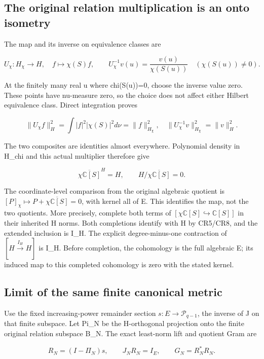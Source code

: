 \subsection{The original relation multiplication is an onto isometry}\label{the-original-relation-multiplication-is-an-onto-isometry}

The map and its inverse on equivalence classes are

\[
U_\chi:H_\chi\longrightarrow H,\quad f\longmapsto\chi(S)f,
\qquad
U_\chi^{-1}v(u)=\frac{v(u)}{\chi(S(u))}\quad(\chi(S(u))\ne0).
\tag{CR6}
\]

At the finitely many real u where chi(S(u))=0, choose the inverse value zero. These points have nu-measure zero, so the choice does not affect either Hilbert equivalence class. Direct integration proves

\[
\|U_\chi f\|_H^2=\int|f|^2|\chi(S)|^2d\nu=\|f\|_{H_\chi}^2,
\quad
\|U_\chi^{-1}v\|_{H_\chi}^2=\|v\|_H^2.
\tag{CR7}
\]

The two composites are identities almost everywhere. Polynomial density in H\_chi and this actual multiplier therefore give

\[
\boxed{\overline{\chi\mathbb C[S]}^{H}=H,
\qquad H/\overline{\chi\mathbb C[S]}=0.}
\tag{CR8}
\]

The coordinate-level comparison from the original algebraic quotient is \([P]_\chi\mapsto P+\overline{\chi\mathbb C[S]}=0\), with kernel all of E. This identifies the map, not the two quotients. More precisely, complete both terms of \([\chi\mathbb C[S]\hookrightarrow\mathbb C[S]]\) in their inherited H norms. Both completions identify with H by CR5/CR8, and the extended inclusion is I\_H. The explicit degree-minus-one contraction of \([H\xrightarrow{I_H}H]\) is I\_H. Before completion, the cohomology is the full algebraic E; its induced map to this completed cohomology is zero with the stated kernel.

\subsection{Limit of the same finite canonical metric}\label{limit-of-the-same-finite-canonical-metric}

Use the fixed increasing-power remainder section \(s:E\to\mathcal P_{q-1}\), the inverse of J on that finite subspace. Let Pi\_N be the H-orthogonal projection onto the finite original relation subspace B\_N. The exact least-norm lift and quotient Gram are

\[
R_N=(I-\Pi_N)s,\qquad J_NR_N=I_E,\qquad
G_N=R_N^*R_N.
\tag{CR9}
\]

